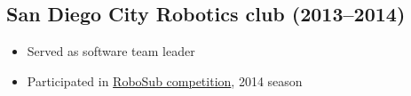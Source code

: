 \documentclass[10pt, letterpaper]{article}
\begin{document}
\begin{multicols}{2}
\begin{minipage}{0.5\textwidth}
    \subsection{San Diego City Robotics club (2013--2014)}
    \begin{footnotesize}
      \begin{itemize}
        \item
          Served as software team leader
        \item
          Participated in
          \href{http://www.robonation.org/competition/robosub}{RoboSub
          competition}, 2014 season
      \end{itemize}
    \end{footnotesize}
  \end{minipage}
\end{multicols}
\end{document}
